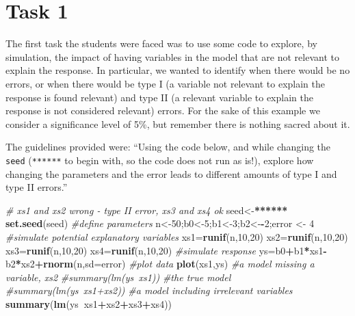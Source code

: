 \documentclass[
]{book}
\newenvironment{Shaded}{\begin{snugshade}}{\end{snugshade}}
\newcommand{\CommentTok}[1]{\textcolor[rgb]{0.56,0.35,0.01}{\textit{#1}}}
\newcommand{\DataTypeTok}[1]{\textcolor[rgb]{0.13,0.29,0.53}{#1}}
\newcommand{\DecValTok}[1]{\textcolor[rgb]{0.00,0.00,0.81}{#1}}
\newcommand{\ErrorTok}[1]{\textcolor[rgb]{0.64,0.00,0.00}{\textbf{#1}}}
\newcommand{\KeywordTok}[1]{\textcolor[rgb]{0.13,0.29,0.53}{\textbf{#1}}}
\newcommand{\NormalTok}[1]{#1}
\newcommand{\OperatorTok}[1]{\textcolor[rgb]{0.81,0.36,0.00}{\textbf{#1}}}
\newcommand{\StringTok}[1]{\textcolor[rgb]{0.31,0.60,0.02}{#1}}
\begin{document}
\hypertarget{task-1}{%
\section{Task 1}\label{task-1}}

The first task the students were faced was to use some code to explore, by simulation, the impact of having variables in the model that are not relevant to explain the response. In particular, we wanted to identify when there would be no errors, or when there would be type I (a variable not relevant to explain the response is found relevant) and type II (a relevant variable to explain the response is not considered relevant) errors. For the sake of this example we consider a significance level of 5\%, but remember there is nothing sacred about it.

The guidelines provided were: ``Using the code below, and while changing the \texttt{seed} (\texttt{******} to begin with, so the code does not run as is!), explore how changing the parameters and the error leads to different amounts of type I and type II errors.''

\begin{Shaded}
\begin{Highlighting}[]
\CommentTok{# xs1 and xs2 wrong - type II error, xs3 and xs4 ok}
\NormalTok{seed<-}\ErrorTok{******}
\KeywordTok{set.seed}\NormalTok{(seed)}
\CommentTok{#define parameters}
\NormalTok{n<-}\DecValTok{50}\NormalTok{;b0<-}\DecValTok{5}\NormalTok{;b1<-}\DecValTok{3}\NormalTok{;b2<-}\OperatorTok{-}\DecValTok{2}\NormalTok{;error <-}\StringTok{ }\DecValTok{4}
\CommentTok{#simulate potential explanatory variables}
\NormalTok{xs1=}\KeywordTok{runif}\NormalTok{(n,}\DecValTok{10}\NormalTok{,}\DecValTok{20}\NormalTok{)}
\NormalTok{xs2=}\KeywordTok{runif}\NormalTok{(n,}\DecValTok{10}\NormalTok{,}\DecValTok{20}\NormalTok{)}
\NormalTok{xs3=}\KeywordTok{runif}\NormalTok{(n,}\DecValTok{10}\NormalTok{,}\DecValTok{20}\NormalTok{)}
\NormalTok{xs4=}\KeywordTok{runif}\NormalTok{(n,}\DecValTok{10}\NormalTok{,}\DecValTok{20}\NormalTok{)}
\CommentTok{#simulate response}
\NormalTok{ys=b0}\OperatorTok{+}\NormalTok{b1}\OperatorTok{*}\NormalTok{xs1}\OperatorTok{-}\NormalTok{b2}\OperatorTok{*}\NormalTok{xs2}\OperatorTok{+}\KeywordTok{rnorm}\NormalTok{(n,}\DataTypeTok{sd=}\NormalTok{error)}
\CommentTok{#plot data}
\KeywordTok{plot}\NormalTok{(xs1,ys)}
\CommentTok{#a model missing a variable, xs2}
\CommentTok{#summary(lm(ys~xs1))}
\CommentTok{#the true model}
\CommentTok{#summary(lm(ys~xs1+xs2))}
\CommentTok{#a model including irrelevant variables}
\KeywordTok{summary}\NormalTok{(}\KeywordTok{lm}\NormalTok{(ys}\OperatorTok{~}\NormalTok{xs1}\OperatorTok{+}\NormalTok{xs2}\OperatorTok{+}\NormalTok{xs3}\OperatorTok{+}\NormalTok{xs4))}
\end{Highlighting}
\end{Shaded}
\end{document}
